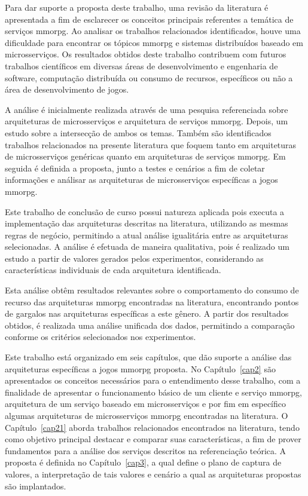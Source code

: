 Para dar suporte a proposta deste trabalho, uma revisão da literatura é apresentada a fim de esclarecer os conceitos principais referentes a temática de serviços \ac{mmorpg}.
%
Ao analisar os trabalhos relacionados identificados, houve uma dificuldade para encontrar os tópicos \ac{mmorpg} e sistemas distribuídos baseado em microsserviços.
%
Os resultados obtidos deste trabalho contribuem com futuros trabalhos científicos em diversas áreas de desenvolvimento e engenharia de software, computação distribuída ou consumo de recursos, específicos ou não a área de desenvolvimento de jogos.



A análise é inicialmente realizada através de uma pesquisa referenciada sobre arquiteturas de microsserviços e arquitetura de serviços \ac{mmorpg}.
%
Depois, um estudo sobre a intersecção de ambos os temas.
%
Também são identificados trabalhos relacionados na presente literatura que foquem tanto em arquiteturas de  microsserviços genéricas quanto em arquiteturas de serviços \ac{mmorpg}.
%
Em seguida é definida a proposta, junto a testes e cenários a fim de coletar informações e análisar as arquiteturas de microsserviços específicas a jogos \ac{mmorpg}.


Este trabalho de conclusão de curso possui natureza aplicada pois executa a implementação das arquiteturas descritas na literatura, utilizando as mesmas regras de negócio, permitindo a atual análise igualitária entre as arquiteturas selecionadas.
%
A análise é efetuada de maneira qualitativa, pois é realizado um estudo a partir de valores gerados pelos experimentos, considerando as características individuais de cada arquitetura identificada.

Esta análise obtêm resultados relevantes sobre o comportamento do consumo de recurso das arquiteturas \ac{mmorpg} encontradas na literatura, encontrando pontos de gargalos nas arquiteturas específicas a este gênero.
%
A partir dos resultados obtidos, é realizada uma análise unificada dos dados, permitindo a comparação conforme os critérios selecionados nos experimentos.

Este trabalho está organizado em seis capítulos, que dão suporte a análise das arquiteturas específicas a jogos \ac{mmorpg} proposta.
%
No Capítulo~\ref{cap2} são apresentados os conceitos necessários para o entendimento desse trabalho, com a finalidade de apresentar o funcionamento básico de um cliente e serviço \ac{mmorpg}, arquitetura de um serviço baseado em microsserviços e por fim em específico algumas arquiteturas de microsserviços \ac{mmorpg} encontradas na literatura.
%
O Capítulo~\ref{cap21} aborda trabalhos relacionados encontrados na literatura, tendo como objetivo principal destacar e comparar suas características, a fim de prover fundamentos para a análise dos serviços descritos na referenciação teórica.
%
A proposta é definida no Capítulo~\ref{cap3}, a qual define o plano de captura de valores, a interpretação de tais valores e cenário a qual as arquiteturas propostas são implantados.

